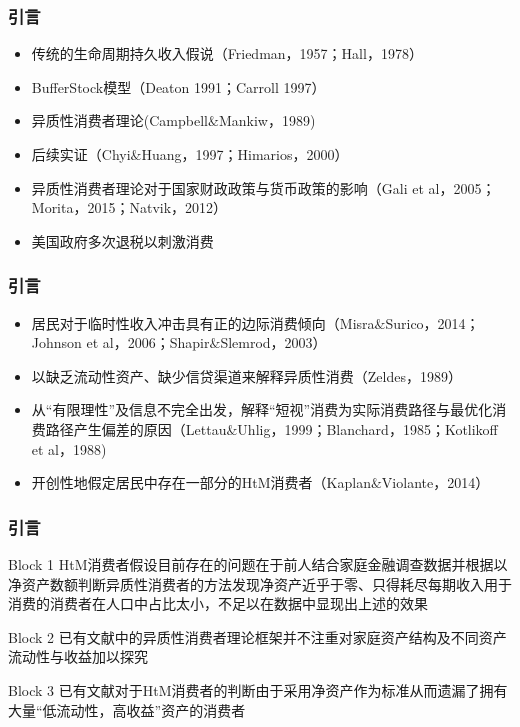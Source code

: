 \documentclass{beamer}
\begin{document}
\begin{frame}
\frametitle{引言}
\begin{itemize}
\item 传统的生命周期持久收入假说（Friedman，1957；Hall，1978）
\item BufferStock模型（Deaton 1991；Carroll 1997）
\item 异质性消费者理论(Campbell$\&$Mankiw，1989)
\item 后续实证（Chyi$\&$Huang，1997；Himarios，2000）
\item 异质性消费者理论对于国家财政政策与货币政策的影响（Gali et al，2005；Morita，2015；Natvik，2012）
\item 美国政府多次退税以刺激消费
\end{itemize}
\end{frame}

\begin{frame}
\frametitle{引言}
\begin{itemize}
\item 居民对于临时性收入冲击具有正的边际消费倾向（Misra$\&$Surico，2014；Johnson et al，2006；Shapir$\&$Slemrod，2003）
\item 以缺乏流动性资产、缺少信贷渠道来解释异质性消费（Zeldes，1989）
\item 从“有限理性”及信息不完全出发，解释“短视”消费为实际消费路径与最优化消费路径产生偏差的原因（Lettau$\&$Uhlig，1999；Blanchard，1985；Kotlikoff et al，1988)
\item 开创性地假定居民中存在一部分的HtM消费者（Kaplan$\&$Violante，2014）
\end{itemize}
\end{frame}

\begin{frame}
\frametitle{引言}
\begin{block}{Block 1}
HtM消费者假设目前存在的问题在于前人结合家庭金融调查数据并根据以净资产数额判断异质性消费者的方法发现净资产近乎于零、只得耗尽每期收入用于消费的消费者在人口中占比太小，不足以在数据中显现出上述的效果
\end{block}

\begin{block}{Block 2}
已有文献中的异质性消费者理论框架并不注重对家庭资产结构及不同资产流动性与收益加以探究
\end{block}

\begin{block}{Block 3}
已有文献对于HtM消费者的判断由于采用净资产作为标准从而遗漏了拥有大量“低流动性，高收益”资产的消费者
\end{block}
\end{frame}
\end{document}
